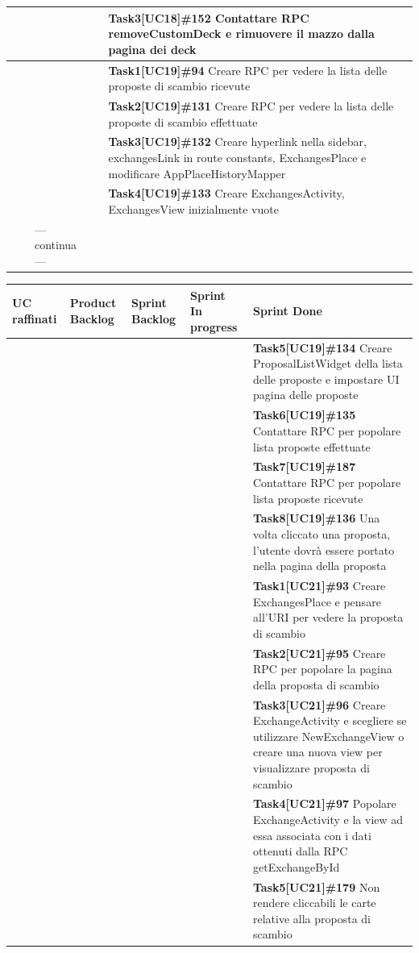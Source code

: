 \documentclass[a4paper, oneside]{article}
\begin{document}
\begin{landscape}
\begin{tabular}{ | p{7cm} | p{3cm} | p{2.8cm} | p{3cm} | p{7.2cm}| }
            & &  & & \textbf{Task3[UC18]\#152} Contattare RPC removeCustomDeck e rimuovere il mazzo dalla pagina dei deck   \\ \hline
            & &  & & \textbf{Task1[UC19]\#94} Creare RPC per vedere la lista delle proposte di scambio ricevute   \\ \hline
            & &  & & \textbf{Task2[UC19]\#131} Creare RPC per vedere la lista delle proposte di scambio effettuate   \\ \hline
            & &  & & \textbf{Task3[UC19]\#132} Creare hyperlink nella sidebar, exchangesLink in route constants, ExchangesPlace e modificare AppPlaceHistoryMapper   \\ \hline
            & &  & & \textbf{Task4[UC19]\#133} Creare ExchangesActivity, ExchangesView inizialmente vuote   \\ \hline
            & & --- continua --- & & \\
            \hline
        \end{tabular}
        \newpage
        \small
        \noindent
        \def\arraystretch{2}%
        \begin{tabular}{ | p{7cm} | p{3cm} | p{2.8cm} | p{3cm} | p{7.2cm}| }
            \hline
            \textbf{UC raffinati}
            & \textbf{Product Backlog}
            & \textbf{Sprint Backlog}
            & \textbf{Sprint In progress}
            & \textbf{Sprint Done} \\
            \hline
            \hline
            & &  & & \textbf{Task5[UC19]\#134} Creare ProposalListWidget della lista delle proposte e impostare UI pagina delle proposte   \\ \hline
            & &  & & \textbf{Task6[UC19]\#135} Contattare RPC per popolare lista proposte effettuate   \\ \hline
            & &  & & \textbf{Task7[UC19]\#187} Contattare RPC per popolare lista proposte ricevute   \\ \hline
            & &  & & \textbf{Task8[UC19]\#136} Una volta cliccato una proposta, l'utente dovrà essere portato nella pagina della proposta   \\ \hline
            & &  & & \textbf{Task1[UC21]\#93} Creare ExchangesPlace e pensare all'URI per vedere la proposta di scambio   \\ \hline
            & &  & & \textbf{Task2[UC21]\#95} Creare RPC per popolare la pagina della proposta di scambio   \\ \hline
            & &  & & \textbf{Task3[UC21]\#96} Creare ExchangeActivity e scegliere se utilizzare NewExchangeView o creare una nuova view per visualizzare proposta di scambio   \\ \hline
            & &  & & \textbf{Task4[UC21]\#97} Popolare ExchangeActivity e la view ad essa associata con i dati ottenuti dalla RPC getExchangeById   \\ \hline
            & &  & & \textbf{Task5[UC21]\#179} Non rendere cliccabili le carte relative alla proposta di scambio   \\ \hline


\end{tabular}
\end{landscape}
\end{document}
